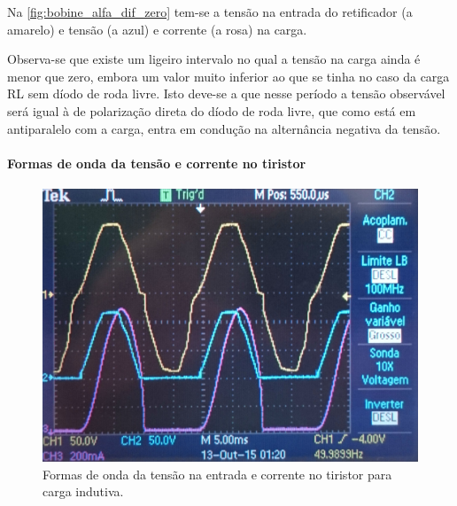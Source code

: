 \documentclass[a4paper,11pt]{article}
\numberwithin{equation}{section}
\begin{document}
Na \autoref{fig:bobine_alfa_dif_zero} tem-se a tensão na entrada do retificador (a amarelo) e tensão (a azul) e corrente (a rosa) na carga.

Observa-se que existe um ligeiro intervalo no qual a tensão na carga ainda é menor que zero, embora um valor muito inferior ao que se tinha no caso da carga RL sem díodo de roda livre. Isto deve-se a que nesse período a tensão observável será igual à de polarização direta do díodo de roda livre, que como está em antiparalelo com a carga, entra em condução na alternância negativa da tensão. 

\paragraph{Formas de onda da tensão e corrente no tiristor}

\begin{figure}[h]
	\centering
	\includegraphics[keepaspectratio=true, scale=0.11]{img/figs/tiristor_alfa_zero}
	\caption{Formas de onda da tensão na entrada e corrente no tiristor para carga indutiva.}
	\label{fig:tiristor_alfa_zero}
	\vspace{-0.8em}
\end{figure}
\end{document}
